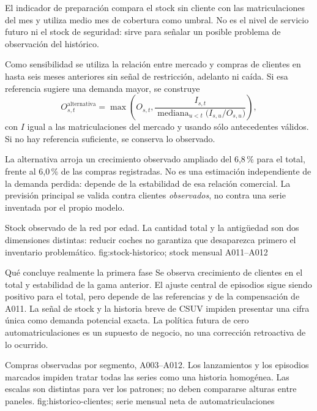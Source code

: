 El indicador de preparación compara el stock sin cliente con las
matriculaciones del mes y utiliza medio mes de cobertura como umbral. No es el
nivel de servicio futuro ni el stock de seguridad: sirve para señalar un posible
problema de observación del histórico.

Como sensibilidad se utiliza la relación entre mercado y compras de clientes
en hasta seis meses anteriores sin señal de restricción, adelanto ni caída.
Si esa referencia sugiere una demanda mayor, se construye
\begin{equation}
 O^{\mathrm{alternativa}}_{s,t}
 =\max\!\left(O_{s,t},\frac{I_{s,t}}
 {\operatorname{mediana}_{u<t}\bigl(I_{s,u}/O_{s,u}\bigr)}\right),
\end{equation}
con $I$ igual a las matriculaciones del mercado y usando sólo antecedentes
válidos. Si no hay referencia suficiente, se conserva lo observado.

La alternativa arroja un crecimiento observado ampliado del 6,8\,\% para el
total, frente al 6,0\,\% de las compras registradas. No es una estimación
independiente de la demanda perdida: depende de la estabilidad de esa relación
comercial. La previsión principal se valida contra clientes \emph{observados},
no contra una serie inventada por el propio modelo.

{Stock observado de la red por edad. La cantidad total y la antigüedad son dos
dimensiones distintas: reducir coches no garantiza que desaparezca primero el
inventario problemático.}
{fig:stock-historico}{; stock mensual A011--A012}

\begin{idea}{Qué concluye realmente la primera fase}
Se observa crecimiento de clientes en el total y estabilidad de la gama anterior.
El ajuste central de episodios sigue siendo positivo para el total, pero depende
de las referencias y de la compensación de A011. La señal de stock y la historia
breve de CSUV impiden presentar una cifra única como demanda potencial exacta.
La política futura de cero automatriculaciones es un supuesto de negocio, no una
corrección retroactiva de lo ocurrido.
\end{idea}
\FloatBarrier
{}
{Compras observadas por segmento, A003--A012. Los lanzamientos y los episodios
marcados impiden tratar todas las series como una historia homogénea. Las escalas
son distintas para ver los patrones; no deben compararse alturas entre paneles.}
{fig:historico-clientes}{; serie mensual neta de automatriculaciones}

